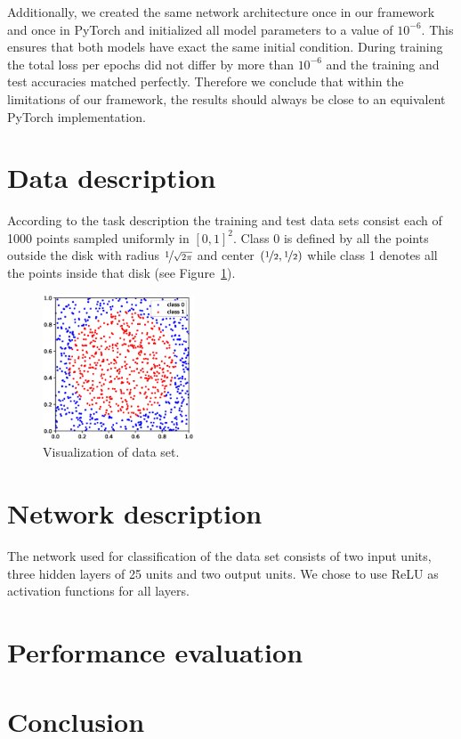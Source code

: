 \documentclass[10pt,conference,compsocconf]{IEEEtran}
\begin{document}
Additionally, we created the same network architecture once in our framework and once in PyTorch and initialized all model parameters to a value of $10^{-6}$. This ensures that both models have exact the same initial condition. During training the total loss per epochs did not differ by more than $10^{-6}$ and the training and test accuracies matched perfectly. Therefore we conclude that within the limitations of our framework, the results should always be close to an equivalent PyTorch implementation.

\section{Data description}
According to the task description the training and test data sets consist each of 1000 points sampled uniformly in $[0,1]^2$. Class 0 is defined by all the points outside the disk with radius $\nicefrac{1}{\sqrt{2\pi}}$ and center $(\nicefrac{1}{2}, \nicefrac{1}{2})$ while class 1 denotes all the points inside that disk (see Figure~\ref{fig:data_set}).

\begin{figure}[h]
  \centering
  \includegraphics[width = 0.4\textwidth]{fig/disk_data_set.eps}
  \caption{Visualization of data set.}
  \label{fig:data_set}
\end{figure}


\section{Network description}
The network used for classification of the data set consists of two input units, three hidden layers of 25 units and two output units. We chose to use ReLU as activation functions for all layers.

\section{Performance evaluation}


\section{Conclusion}




\end{document}
